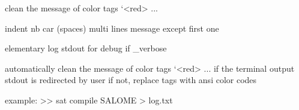 \documentclass[a4paper,10pt,english]{sphinxmanual}
\begin{document}

\begin{fulllineitems}
\label{commands/apidoc/src:src.coloringSat.cleanColors}
clean the message of color tags `\textless{}red\textgreater{} ...

\end{fulllineitems}


\begin{fulllineitems}
\label{commands/apidoc/src:src.coloringSat.indent}
indent nb car (spaces) multi lines message except first one

\end{fulllineitems}


\begin{fulllineitems}
\label{commands/apidoc/src:src.coloringSat.log}
elementary log stdout for debug if \_verbose

\end{fulllineitems}


\begin{fulllineitems}
\label{commands/apidoc/src:src.coloringSat.replace}
\end{fulllineitems}


\begin{fulllineitems}
\label{commands/apidoc/src:src.coloringSat.toColor}
automatically clean the message of color tags `\textless{}red\textgreater{} ... 
if the terminal output stdout is redirected by user
if not, replace tags with ansi color codes

example:
\textgreater{}\textgreater{} sat compile SALOME \textgreater{} log.txt

\end{fulllineitems}
\end{document}
